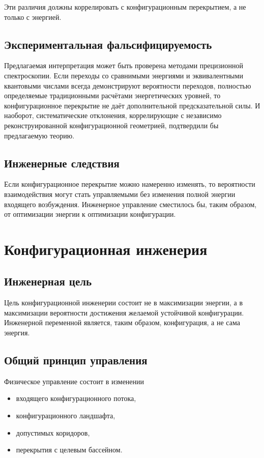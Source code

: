 Эти различия должны коррелировать с конфигурационным перекрытием, а не только с энергией.

\section{Экспериментальная фальсифицируемость}

Предлагаемая интерпретация может быть проверена методами прецизионной спектроскопии. Если переходы со сравнимыми энергиями и эквивалентными квантовыми числами всегда демонстрируют вероятности переходов, полностью определяемые традиционными расчётами энергетических уровней, то конфигурационное перекрытие не даёт дополнительной предсказательной силы. И наоборот, систематические отклонения, коррелирующие с независимо реконструированной конфигурационной геометрией, подтвердили бы предлагаемую теорию.

\section{Инженерные следствия}

Если конфигурационное перекрытие можно намеренно изменять, то вероятности взаимодействия могут стать управляемыми без изменения полной энергии входящего возбуждения. Инженерное управление сместилось бы, таким образом, от оптимизации энергии к оптимизации конфигурации.

\chapter{Конфигурационная инженерия}

\section{Инженерная цель}

Цель конфигурационной инженерии состоит не в максимизации энергии, а в максимизации вероятности достижения желаемой устойчивой конфигурации. Инженерной переменной является, таким образом, конфигурация, а не сама энергия.

\section{Общий принцип управления}

Физическое управление состоит в изменении

\begin{itemize}
\item входящего конфигурационного потока,
\item конфигурационного ландшафта,
\item допустимых коридоров,
\item перекрытия с целевым бассейном.
\end{itemize}

